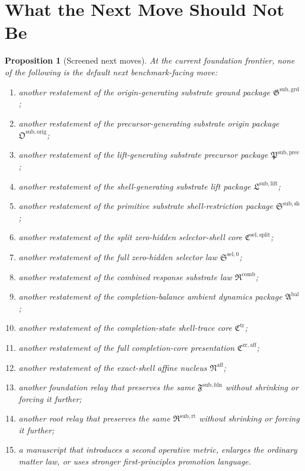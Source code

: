 \documentclass[11pt]{article}
\newcommand{\CompletionCore}{\mathfrak C^{\mathrm{zr,aff}}}
\newcommand{\TraceCore}{\mathfrak C^{\mathrm{tr}}}
\newcommand{\AffineNucleus}{\mathfrak N^{\mathrm{aff}}}
\newcommand{\AmbientPackage}{\mathfrak A^{\mathrm{bal}}}
\newcommand{\CombinedLaw}{\mathfrak R^{\mathrm{comb}}}
\newcommand{\SelectorLaw}{\mathfrak S^{\mathrm{sel},0}}
\newcommand{\SelectorCore}{\mathfrak C^{\mathrm{sel,split}}}
\newcommand{\ShellRestriction}{\mathfrak S^{\mathrm{sub,sh}}}
\newcommand{\LiftPackage}{\mathfrak L^{\mathrm{sub,lift}}}
\newcommand{\PrecursorPackage}{\mathfrak P^{\mathrm{sub,prec}}}
\newcommand{\OriginPackage}{\mathfrak O^{\mathrm{sub,orig}}}
\newcommand{\GroundPackage}{\mathfrak G^{\mathrm{sub,grd}}}
\newcommand{\FoundationPackage}{\mathfrak F^{\mathrm{sub,fdn}}}
\newcommand{\RootPackage}{\mathfrak R^{\mathrm{sub,rt}}}
\newtheorem{proposition}{Proposition}
\begin{document}
\section{What the Next Move Should Not Be}

\begin{proposition}[Screened next moves]
At the current foundation frontier, none of the following is the default next benchmark-facing move:
\begin{enumerate}
    \item another restatement of the origin-generating substrate ground package \(\GroundPackage\);
    \item another restatement of the precursor-generating substrate origin package \(\OriginPackage\);
    \item another restatement of the lift-generating substrate precursor package \(\PrecursorPackage\);
    \item another restatement of the shell-generating substrate lift package \(\LiftPackage\);
    \item another restatement of the primitive substrate shell-restriction package \(\ShellRestriction\);
    \item another restatement of the split zero-hidden selector-shell core \(\SelectorCore\);
    \item another restatement of the full zero-hidden selector law \(\SelectorLaw\);
    \item another restatement of the combined response substrate law \(\CombinedLaw\);
    \item another restatement of the completion-balance ambient dynamics package \(\AmbientPackage\);
    \item another restatement of the completion-state shell-trace core \(\TraceCore\);
    \item another restatement of the full completion-core presentation \(\CompletionCore\);
    \item another restatement of the exact-shell affine nucleus \(\AffineNucleus\);
    \item another foundation relay that preserves the same \(\FoundationPackage\) without shrinking or forcing it further;
    \item another root relay that preserves the same \(\RootPackage\) without shrinking or forcing it further;
    \item a manuscript that introduces a second operative metric, enlarges the ordinary matter law, or uses stronger first-principles promotion language.
\end{enumerate}
\end{proposition}
\end{document}
